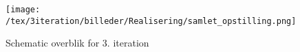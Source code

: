 \begin{figure}[H]
	\center
	\texttt{[image: /tex/3iteration/billeder/Realisering/samlet\_opstilling.png]}
	\caption{Schematic overblik for 3. iteration}
	\label{fig:samlet_opstilling}
\end{figure}
















\clearpage

